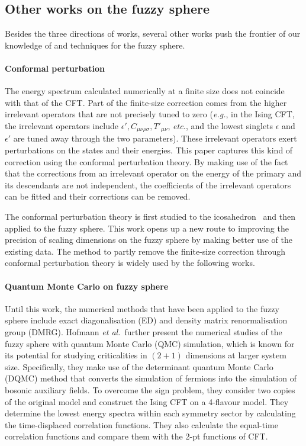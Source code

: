 \documentclass{timesjhep}
\begin{document}
\subsection{Other works on the fuzzy sphere}

Besides the three directions of works, several other works push the frontier of our knowledge of and techniques for the fuzzy sphere.

\paragraph{Conformal perturbation~\cite{Laeuchli2025}}

The energy spectrum calculated numerically at a finite size does not coincide with that of the CFT. Part of the finite-size correction comes from the higher irrelevant operators that are not precisely tuned to zero (\textit{e.g.}, in the Ising CFT, the irrelevant operators include $\epsilon', C_{\mu\nu\rho\sigma}, T'_{\mu\nu}$, \textit{etc.}, and the lowest singlets $\epsilon$ and $\epsilon'$ are tuned away through the two parameters). These irrelevant operators exert perturbations on the states and their energies. This paper captures this kind of correction using the conformal perturbation theory. By making use of the fact that the corrections from an irrelevant operator on the energy of the primary and its descendants are not independent, the coefficients of the irrelevant operators can be fitted and their corrections can be removed.

The conformal perturbation theory is first studied to the icosahedron~\cite{Lao2023} and then applied to the fuzzy sphere. This work opens up a new route to improving the precision of scaling dimensions on the fuzzy sphere by making better use of the existing data. The method to partly remove the finite-size correction through conformal perturbation theory is widely used by the following works.

\paragraph{Quantum Monte Carlo on fuzzy sphere~\cite{Hofmann2023}}

Until this work, the numerical methods that have been applied to the fuzzy sphere include exact diagonalisation (ED) and density matrix renormalisation group (DMRG). Hofmann \textit{et al.}~further present the numerical studies of the fuzzy sphere with quantum Monte Carlo (QMC) simulation, which is known for its potential for studying criticalities in $(2+1)$ dimensions at larger system size. Specifically, they make use of the determinant quantum Monte Carlo (DQMC) method that converts the simulation of fermions into the simulation of bosonic auxiliary fields. To overcome the sign problem, they consider two copies of the original model and construct the Ising CFT on a 4-flavour model. They determine the lowest energy spectra within each symmetry sector by calculating the time-displaced correlation functions. They also calculate the equal-time correlation functions and compare them with the 2-pt functions of CFT.
\end{document}
